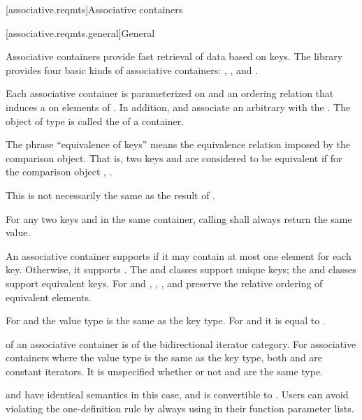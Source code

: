 [associative.reqmts]{Associative containers}

[associative.reqmts.general]{General}

\pnum
Associative containers provide fast retrieval of data based on keys.
The library provides four basic kinds of associative containers:
,
,
and
.

\pnum
Each associative container is parameterized on
and an ordering relation
that induces a  on
elements of
.
In addition,
and
associate an arbitrary 
with the
.
The object of type
is called the
of a container.

\pnum
The phrase ``equivalence of keys'' means the equivalence relation imposed by the
comparison object.
That is, two keys
and
are considered to be equivalent if for the
comparison object
,
.
\begin{note}
This is not necessarily the same as the result of .
\end{note}
For any two keys
and
in the same container, calling
shall always return the same value.

\pnum
An associative container supports  if it may contain at
most one element for each key. Otherwise, it supports .
The  and  classes support unique keys; the 
and  classes support equivalent keys.
For  and ,
, , and  preserve the relative ordering
of equivalent elements.

\pnum
For  and  the value type is the same as the key type.
For  and  it is equal to .

\pnum
{}
of an associative container is of the bidirectional iterator category.
For associative containers where the value type is the same as the key type, both
and
are constant iterators. It is unspecified whether or not
and
are the same type.
\begin{note}
 and  have identical semantics in this case, and  is convertible to . Users can avoid violating the one-definition rule by always using  in their function parameter lists.
\end{note}

